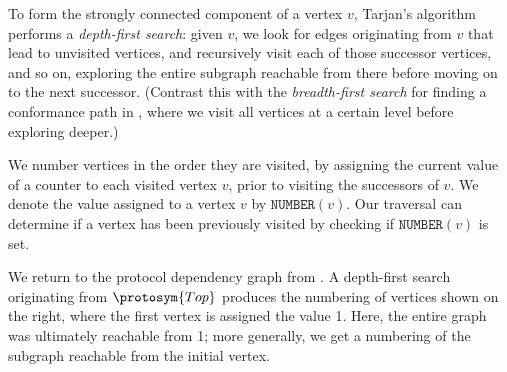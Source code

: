 \documentclass[../generics]{subfiles}
\begin{document}
\newcommand{\Number}[1]{\texttt{NUMBER}(#1)}
\newcommand{\Lowlink}[1]{\texttt{LOWLINK}(#1)}
\newcommand{\OnStack}[1]{\texttt{ONSTACK}(#1)}

To form the strongly connected component of a vertex $v$, Tarjan's algorithm performs a \emph{depth-first search}: given $v$, we look for edges originating from $v$ that lead to unvisited vertices, and recursively visit each of those successor vertices, and so on, exploring the entire subgraph reachable from there before moving on to the next successor. (Contrast this with the \emph{breadth-first search} for finding a conformance path in , where we visit all vertices at a certain level before exploring deeper.)

\begin{figure}
\end{figure}

We number vertices in the order they are visited, by assigning the current value of a counter to each visited vertex $v$, prior to visiting the successors of $v$. We denote the value assigned to a vertex $v$ by $\Number{v}$. Our traversal can determine if a vertex has been previously visited by checking if $\Number{v}$ is set.

We return to the protocol dependency graph from . A depth-first search originating from $\protosym{Top}$ produces the numbering of vertices shown on the right, where the first vertex is assigned the value 1. Here, the entire graph was ultimately reachable from 1; more generally, we get a numbering of the subgraph reachable from the initial vertex.
\end{document}

